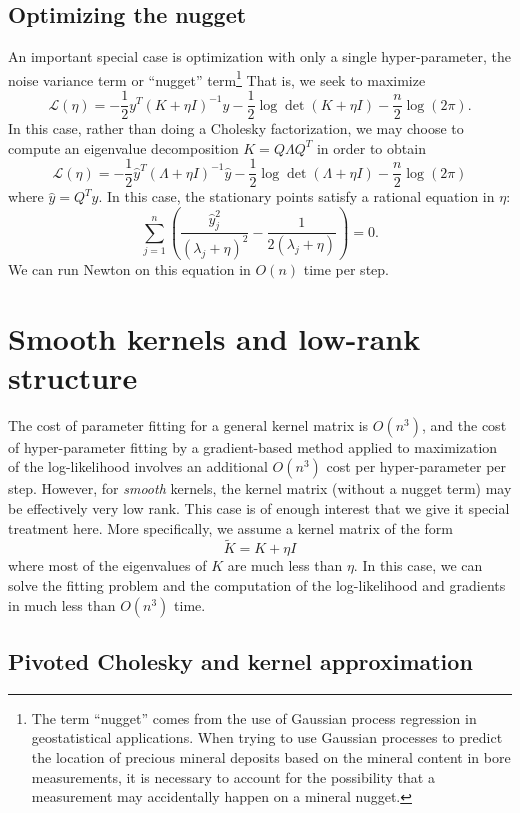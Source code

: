 \documentclass[12pt, leqno]{article} %
\begin{document}
\subsection{Optimizing the nugget}

An important special case is optimization with only a single
hyper-parameter, the noise variance term or ``nugget''
term\footnote{The term ``nugget'' comes from the use of Gaussian
  process regression in geostatistical applications.  When trying
  to use Gaussian processes to predict the location of precious
  mineral deposits based on the mineral content in bore measurements,
  it is necessary to account for the possibility that a measurement
  may accidentally happen on a mineral nugget.}
That is, we seek to maximize
\[
  \mathcal{L}(\eta) =
    -\frac{1}{2} y^T (K + \eta I)^{-1} y - \frac{1}{2} \log \det (K + \eta I) -
     \frac{n}{2} \log(2\pi).
\]
In this case, rather than doing a Cholesky factorization, we may
choose to compute an eigenvalue decomposition $K = Q \Lambda Q^T$
in order to obtain
\[
  \mathcal{L}(\eta) =
    -\frac{1}{2} \hat{y}^T (\Lambda + \eta I)^{-1} \hat{y}
    -\frac{1}{2} \log \det (\Lambda + \eta I) -
    \frac{n}{2} \log(2\pi)
\]
where $\hat{y} = Q^T y$.  In this case, the stationary points
satisfy a rational equation in $\eta$:
\[
\sum_{j=1}^n \left( \frac{\hat{y}_j^2}{(\lambda_j + \eta)^2}
                 - \frac{1}{2 (\lambda_j + \eta)} \right) = 0.
\]
We can run Newton on this equation in $O(n)$ time per step.

\section{Smooth kernels and low-rank structure}

The cost of parameter fitting for a general kernel matrix is $O(n^3)$,
and the cost of hyper-parameter fitting by a gradient-based method
applied to maximization of the log-likelihood involves an
additional $O(n^3)$ cost per hyper-parameter per step.  However,
for {\em smooth} kernels, the kernel matrix (without a nugget term)
may be effectively very low rank.  This case is of enough interest
that we give it special treatment here.  More specifically, we assume
a kernel matrix of the form
\[
  \tilde{K} = K + \eta I
\]
where most of the eigenvalues of $K$ are much less than $\eta$.  In
this case, we can solve the fitting problem and the computation of the
log-likelihood and gradients in much less than $O(n^3)$ time.

\subsection{Pivoted Cholesky and kernel approximation}
\end{document}
